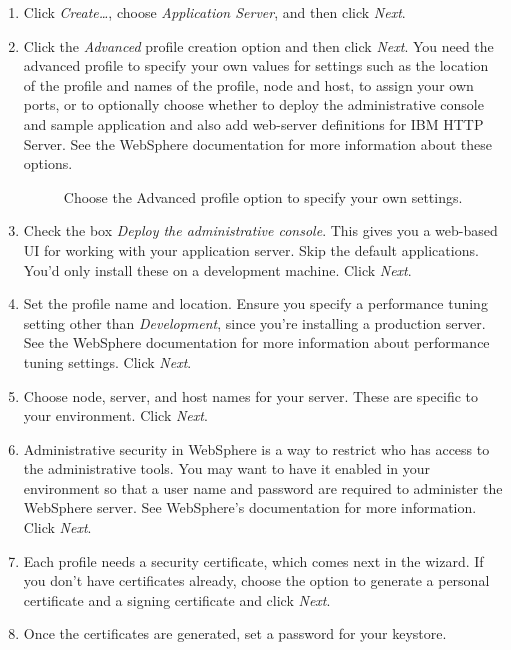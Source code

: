 \begin{enumerate}
\def\labelenumi{\arabic{enumi}.}
\item
  Click \emph{Create\ldots{}}, choose \emph{Application Server}, and
  then click \emph{Next}.
\item
  Click the \emph{Advanced} profile creation option and then click
  \emph{Next}. You need the advanced profile to specify your own values
  for settings such as the location of the profile and names of the
  profile, node and host, to assign your own ports, or to optionally
  choose whether to deploy the administrative console and sample
  application and also add web-server definitions for IBM HTTP Server.
  See the WebSphere documentation for more information about these
  options.

  \begin{figure}
  \centering
  \caption{Choose the Advanced profile option to specify your own
  settings.}
  \end{figure}
\item
  Check the box \emph{Deploy the administrative console}. This gives you
  a web-based UI for working with your application server. Skip the
  default applications. You'd only install these on a development
  machine. Click \emph{Next}.
\item
  Set the profile name and location. Ensure you specify a performance
  tuning setting other than \emph{Development}, since you're installing
  a production server. See the WebSphere documentation for more
  information about performance tuning settings. Click \emph{Next}.
\item
  Choose node, server, and host names for your server. These are
  specific to your environment. Click \emph{Next}.
\item
  Administrative security in WebSphere is a way to restrict who has
  access to the administrative tools. You may want to have it enabled in
  your environment so that a user name and password are required to
  administer the WebSphere server. See WebSphere's documentation for
  more information. Click \emph{Next}.
\item
  Each profile needs a security certificate, which comes next in the
  wizard. If you don't have certificates already, choose the option to
  generate a personal certificate and a signing certificate and click
  \emph{Next}.
\item
  Once the certificates are generated, set a password for your keystore.

\end{enumerate}
